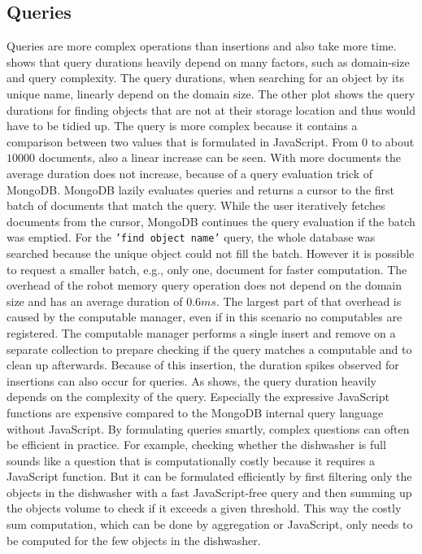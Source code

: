 \subsection{Queries}
\label{sec:queries}
Queries are more complex operations than insertions and also take more
time.  shows that query durations heavily
depend on many factors, such as domain-size and query complexity. The
query durations, when searching for an object by its unique name,
linearly depend on the domain size. The other plot shows the query
durations for finding objects that are not at their storage location
and thus would have to be tidied up. The query is more complex
because it contains a comparison between two values that is formulated
in JavaScript. From $0$ to about $10000$ documents, also a linear
increase can be seen. With more documents the average duration does
not increase, because of a query evaluation trick of MongoDB. MongoDB
lazily evaluates queries and returns a cursor to the first batch of
documents that match the query. While the user iteratively fetches
documents from the cursor, MongoDB continues the query evaluation if
the batch was emptied. For the \texttt{'find object name'} query, the whole
database was searched because the unique object could not fill the
batch. However it is possible to request a smaller batch, e.g., only
one, document for faster computation.   The overhead of the robot memory query operation does not
depend on the domain size and has an average duration of $0.6ms$. The
largest part of that overhead is caused by the computable manager,
even if in this scenario no computables are registered. The computable
manager performs a single insert and remove on a separate collection
to prepare checking if the query matches a computable and to clean up
afterwards. Because of this insertion, the duration spikes observed
for insertions can also occur for queries. As 
shows, the query duration heavily depends on the complexity of the
query. Especially the expressive JavaScript functions are expensive
compared to the MongoDB internal query language without JavaScript. By
formulating queries smartly, complex questions can often be
efficient in practice. For example, checking whether the dishwasher
is full sounds like a question that is computationally costly because
it requires a JavaScript function. But it can be formulated efficiently
by first filtering only the objects in the dishwasher with a fast
JavaScript-free query and then summing up the objects volume to check
if it exceeds a given threshold. This way the costly sum computation,
which can be done by aggregation or JavaScript, only needs to be
computed for the few objects in the dishwasher.

